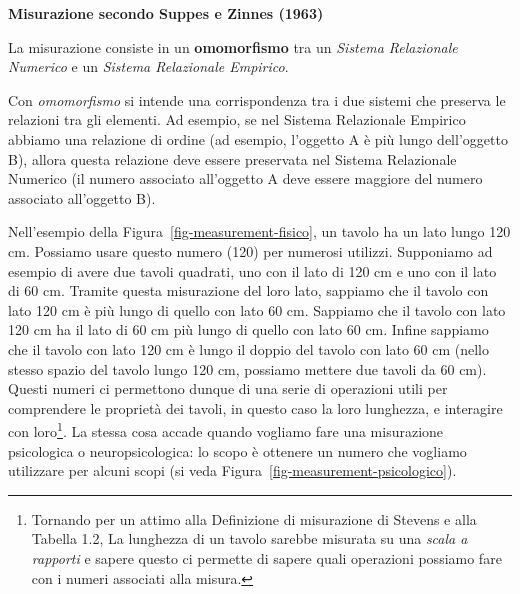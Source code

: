 \documentclass[
  italian,
  letterpaper,
  paper=A4,
  headinclude=on,
  footinclude=on,
  12pt]{scrbook}
\begin{document}
\begin{tcolorbox}[enhanced jigsaw, left=2mm, colbacktitle=quarto-callout-note-color!10!white, bottomrule=.15mm, opacityback=0, coltitle=black, colframe=quarto-callout-note-color-frame, opacitybacktitle=0.6, leftrule=.75mm, colback=white, toprule=.15mm, title=\textcolor{quarto-callout-note-color}{\faInfo}\hspace{0.5em}{Definizione}, titlerule=0mm, arc=.35mm, breakable, rightrule=.15mm, bottomtitle=1mm, toptitle=1mm]

\textbf{Misurazione secondo Suppes e Zinnes (1963)}

La misurazione consiste in un \textbf{omomorfismo} tra un \emph{Sistema
Relazionale Numerico} e un \emph{Sistema Relazionale Empirico}.

\end{tcolorbox}

Con \emph{omomorfismo} si intende una corrispondenza tra i due sistemi
che preserva le relazioni tra gli elementi. Ad esempio, se nel Sistema
Relazionale Empirico abbiamo una relazione di ordine (ad esempio,
l'oggetto A è più lungo dell'oggetto B), allora questa relazione deve
essere preservata nel Sistema Relazionale Numerico (il numero associato
all'oggetto A deve essere maggiore del numero associato all'oggetto B).

Nell'esempio della Figura~\ref{fig-measurement-fisico}, un tavolo ha un
lato lungo 120 cm. Possiamo usare questo numero (120) per numerosi
utilizzi. Supponiamo ad esempio di avere due tavoli quadrati, uno con il
lato di 120 cm e uno con il lato di 60 cm. Tramite questa misurazione
del loro lato, sappiamo che il tavolo con lato 120 cm è più lungo di
quello con lato 60 cm. Sappiamo che il tavolo con lato 120 cm ha il lato
di 60 cm più lungo di quello con lato 60 cm. Infine sappiamo che il
tavolo con lato 120 cm è lungo il doppio del tavolo con lato 60 cm
(nello stesso spazio del tavolo lungo 120 cm, possiamo mettere due
tavoli da 60 cm). Questi numeri ci permettono dunque di una serie di
operazioni utili per comprendere le proprietà dei tavoli, in questo caso
la loro lunghezza, e interagire con loro\footnote{Tornando per un attimo
  alla Definizione di misurazione di Stevens e alla Tabella 1.2, La
  lunghezza di un tavolo sarebbe misurata su una \emph{scala a rapporti}
  e sapere questo ci permette di sapere quali operazioni possiamo fare
  con i numeri associati alla misura.}. La stessa cosa accade quando
vogliamo fare una misurazione psicologica o neuropsicologica: lo scopo è
ottenere un numero che vogliamo utilizzare per alcuni scopi (si veda
Figura~\ref{fig-measurement-psicologico}).
\end{document}

